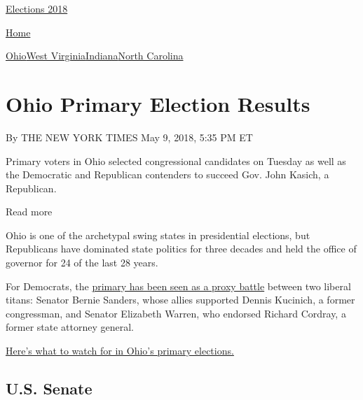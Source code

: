 \href{//www.nytimes3xbfgragh.onion}{}\href{https://www.nytimes3xbfgragh.onion/interactive/2018/us/elections/calendar-primary-results.html}{
Elections 2018}

\href{//www.nytimes3xbfgragh.onion}{ Home}

\href{https://www.nytimes3xbfgragh.onion/interactive/2018/05/08/us/elections/results-ohio-primary-elections.html}{Ohio}\href{https://www.nytimes3xbfgragh.onion/interactive/2018/05/08/us/elections/results-west-virginia-primary-elections.html}{West
Virginia}\href{https://www.nytimes3xbfgragh.onion/interactive/2018/05/08/us/elections/results-indiana-primary-elections.html}{Indiana}\href{https://www.nytimes3xbfgragh.onion/interactive/2018/05/08/us/elections/results-north-carolina-primary-elections.html}{North
Carolina}

\hypertarget{ohio-primary-election-results}{%
\section{Ohio Primary Election
Results}\label{ohio-primary-election-results}}

By THE NEW YORK TIMES May 9, 2018, 5:35 PM ET

Primary voters in Ohio selected congressional candidates on Tuesday as
well as the Democratic and Republican contenders to succeed Gov. John
Kasich, a Republican.

Read more

Ohio is one of the archetypal swing states in presidential elections,
but Republicans have dominated state politics for three decades and held
the office of governor for 24 of the last 28 years.

For Democrats, the
\href{https://www.nytimes3xbfgragh.onion/2018/04/29/us/politics/ohio-governor-richard-cordray-dennis-kucinich.html}{primary
has been seen as a proxy battle} between two liberal titans: Senator
Bernie Sanders, whose allies supported Dennis Kucinich, a former
congressman, and Senator Elizabeth Warren, who endorsed Richard Cordray,
a former state attorney general.

\href{https://www.nytimes3xbfgragh.onion/interactive/2018/05/08/us/politics/republican-senate-primaries-west-virginia-indiana-ohio.html}{Here's
what to watch for in Ohio's primary elections.}

\hypertarget{us-senate}{%
\subsection{U.S. Senate}\label{us-senate}}

